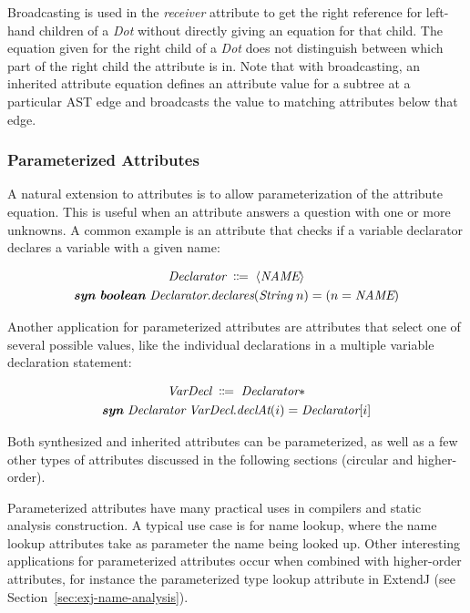 \documentclass[10pt, twoside, openright]{book}
\newcommand{\secref}[1]{Section~\ref{#1}}
\begin{document}
Broadcasting is used in the \emph{receiver} attribute to get the right reference for
left-hand children of a \emph{Dot} without directly giving an equation for that child.
The equation given for the right child of a \emph{Dot}
does not distinguish between which part of the right child the attribute is in.
Note that with broadcasting,
an inherited attribute equation defines an attribute value for a subtree at
a particular AST edge and broadcasts the value to matching attributes below that edge.


\subsubsection{Parameterized Attributes}

A natural extension to attributes is to allow parameterization of the attribute equation.
This is useful when an attribute answers a question with one or more unknowns.
A common example is an attribute that checks if a variable declarator declares a variable with
a given name:


\vbox{%
\begin{gather*}
\textit{Declarator} \; \Coloneqq \; \langle\textit{NAME}\rangle \\
\textbf{\textit{syn}} \; \textbf{\textit{boolean}} \; \textit{Declarator}.\textit{declares}(\textit{String} \; n) = (n = \textit{NAME})
\end{gather*}
}

\noindent
Another application for parameterized attributes are attributes that select
one of several possible values, like the individual declarations in a multiple
variable declaration statement:


\vbox{%
\begin{gather*}
\textit{VarDecl} \; \Coloneqq \; \textit{Declarator}\ast \\
\textbf{\textit{syn}} \; \textit{Declarator} \; \textit{VarDecl}.\textit{declAt}(i) = \textit{Declarator}[i]
\end{gather*}
}

Both synthesized and inherited attributes can be parameterized, as well as a few other types of
attributes discussed in the following sections (circular and higher-order).

\goodbreak
Parameterized attributes have many practical uses in compilers and static analysis construction.
A typical use case is for name lookup, where the name lookup attributes take as parameter
the name being looked up.
Other interesting applications for parameterized attributes occur when
combined with higher-order attributes, for instance the parameterized type
lookup attribute in ExtendJ (see \secref{sec:exj-name-analysis}).
\end{document}

